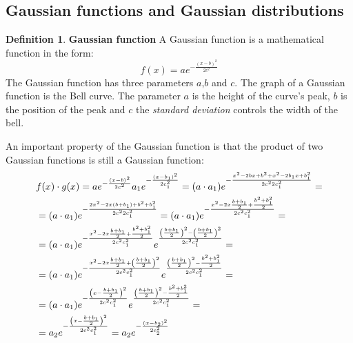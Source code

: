 \documentclass[12pt, letterpaper]{article}
\theoremstyle{definition}
\newtheorem{definition}{Definition}[section]
\DeclarePairedDelimiter\autobracket{(}{)}
\newcommand{\br}[1]{\autobracket*{#1}}
\begin{document}
\subsection{Gaussian functions and Gaussian distributions}
\label{gaussian}
\begin{definition}{\textbf{Gaussian function}}
A Gaussian function is a mathematical function in the form:
\begin{equation}
f(x) = a e^{-\frac{(x-b)^2}{2c^2}}
\end{equation}
The Gaussian function has three parameters $a$,$b$ and $c$. The graph of a Gaussian function is the Bell curve. The parameter $a$ is the height of the curve's peak, $b$ is the position of the peak and $c$ the \textit{standard deviation} controls the width of the bell.

An important property of the Gaussian function is that the product of two Gaussian functions is still a Gaussian function:
\begin{equation}
\label{gauss2}
\begin{aligned}
&f(x) \cdot g(x) = a e^{-\frac{(x-b)^2}{2c^2}} a_1 e^{-\frac{(x-b_1)^2}{2c_1^2}} = (a\cdot a_1) e^{-\frac{x^2-2bx+b^2 + x^2-2b_1x+b_1^2}{2c^2 2c_1^2}}=\\
&= (a\cdot a_1) e^{-\frac{2x^2-2x(b+b_1)+ b^2 +b_1^2}{2c^2 2c_1^2}} = (a\cdot a_1) e^{-\frac{x^2-2x\frac{b +b_1}{2}+ \frac{b^2 +b_1^2}{2}}{2c^2 c_1^2}} = \\
&=(a\cdot a_1) e^{-\frac{x^2-2x\frac{b +b_1}{2}+ \frac{b^2 +b_1^2}{2}}{2c^2 c_1^2}} e^{\frac{\br{\frac{b +b_1}{2}}^2 - \br{\frac{b+b_1}{2}}^2 } {2c^2 c_1^2}}=  \\
&=(a\cdot a_1) e^{-\frac{x^2-2x\frac{b +b_1}{2}+\br{\frac{b +b_1}{2}}^2}{2c^2 c_1^2}} e^{\frac{\br{\frac{b +b_1}{2}}^2 - \frac{b^2 +b_1^2}{2}} {2c^2 c_1^2}} = \\
&=(a\cdot a_1) e^{-\frac{\br{x-\frac{b +b_1}{2}}^2}{2c^2 c_1^2}} e^{\frac{\br{\frac{b +b_1}{2}}^2 - \frac{b^2 +b_1^2}{2}} {2c^2 c_1^2}} = \\
&= a_2 e^{-\frac{\br{x-\frac{b +b_1}{2}}^2}{2c^2 c_1^2}} = a_2 e^{-\frac{\br{x-b_2}^2}{2c_2^2}}
\end{aligned}
\end{equation}
\end{definition}
\end{document}
